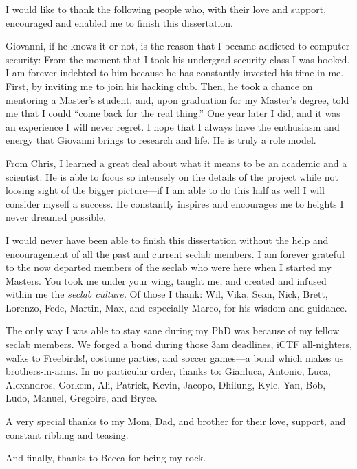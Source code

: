 \begin{acknowledgements}

I would like to thank the following people who, with their love and
support, encouraged and enabled me to finish this dissertation.

Giovanni, if he knows it or not, is the reason that I became addicted
to computer security: From the moment that I took his undergrad
security class I was hooked. I am forever indebted to him because he
has constantly invested his time in me. First, by inviting me to join
his hacking club. Then, he took a chance on mentoring a Master's
student, and, upon graduation for my Master's degree, told me that I
could ``come back for the real thing.'' One year later I did, and it
was an experience I will never regret. I hope that I always have the
enthusiasm and energy that Giovanni brings to research and life. He is
truly a role model.

From Chris, I learned a great deal about what it means to be an
academic and a scientist. He is able to focus so intensely on the
details of the project while not loosing sight of the bigger
picture---if I am able to do this half as well I will consider myself
a success. He constantly inspires and encourages me to heights I never
dreamed possible.

I would never have been able to finish this dissertation without the
help and encouragement of all the past and current seclab members. I
am forever grateful to the now departed members of the seclab who were
here when I started my Masters. You took me under your wing, taught
me, and created and infused within me the \emph{seclab culture.} Of
those I thank: Wil, Vika, Sean, Nick, Brett, Lorenzo, Fede, Martin,
Max, and especially Marco, for his wisdom and guidance.

The only way I was able to stay sane during my PhD was because of my
fellow sec\-lab members. We forged a bond during those 3am deadlines,
iCTF all-nighters, walks to Freebirds!, costume parties, and soccer
games---a bond which makes us brothers-in-arms. In no particular
order, thanks to: Gianluca, Antonio, Luca, Alexandros, Gorkem, Ali,
Patrick, Kevin, Jacopo, Dhilung, Kyle, Yan, Bob, Ludo, Manuel,
Gregoire, and Bryce.

A very special thanks to my Mom, Dad, and brother for their love,
support, and constant ribbing and teasing.

And finally, thanks to Becca for being my rock.

\end{acknowledgements}
